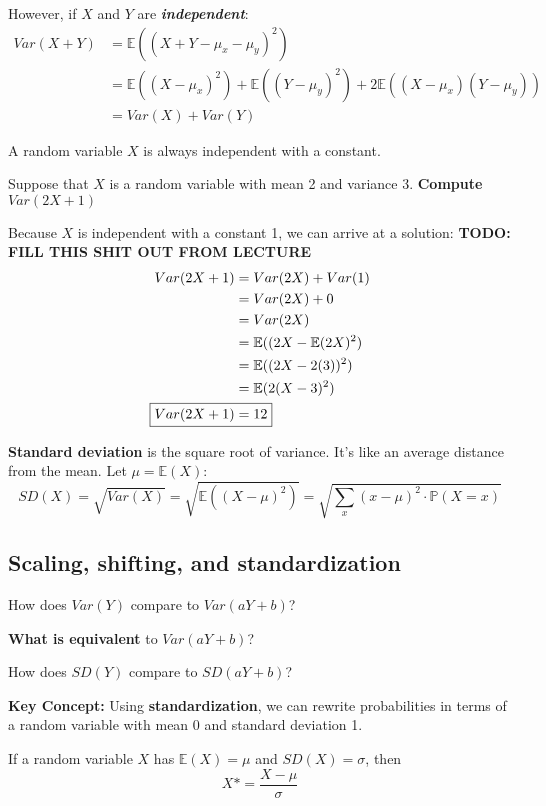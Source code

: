 \documentclass[titlepage, 12pt, leqno]{article}
\begin{document}
However, if $X$ and $Y$ are \textbf{\textit{independent}}:
\begin{align*}
    Var(X+Y) &= \mathbb{E}((X+Y-\mu_x-\mu_y)^2) \\
             &= \mathbb{E}((X-\mu_x)^2) + \mathbb{E}((Y-\mu_y)^2) +
             2 \mathbb{E}((X-\mu_x)(Y-\mu_y)) \\
             &= Var(X) + Var(Y)
\end{align*}

\begin{note}
    A random variable $X$ is always independent with a constant.
\end{note}

\begin{ex}
    Suppose that $X$ is a random variable with mean 2 and variance 3. 
    \textbf{Compute} $Var(2X+1)$
    \vspace{10px}
    
    Because $X$ is independent with a constant 1, we can arrive at a solution:
    \textbf{TODO: FILL THIS SHIT OUT FROM LECTURE}
   \begin{align*}
       Var(2X+1) &= Var(2X) + Var(1) \\
                 &= Var(2X) + 0 \\
                 &= Var(2X) \\
                 &= \mathbb{E}((2X- \mathbb{E}(2X)^2) \\
                 &= \mathbb{E}((2X - 2(3))^2) \\
                 &= \mathbb{E}(2(X-3)^2) \\
       \Aboxed{Var(2X+1)  &= 12} 
   \end{align*}
\end{ex}

\begin{definition}
    \textbf{Standard deviation} is the square root of variance. It's like an
    average distance from the mean. Let $\mu = \mathbb{E}(X)$:
\[
SD(X) = \sqrt{Var(X)} = \sqrt{ \mathbb{E}((X-\mu)^2)}
= \sqrt{\sum_{x}(x-\mu)^2\cdot \mathbb{P}(X=x)}
\]
\end{definition}

\subsection{Scaling, shifting, and standardization}
How does $Var(Y)$ compare to $Var(aY+b)$?

\begin{ex}
    \textbf{What is equivalent} to $Var(aY+b)$?
\end{ex}

\begin{ex}
    How does $SD(Y)$ compare to $SD(aY+b)$?
\end{ex}

\textbf{Key Concept:}
Using \textbf{standardization}, we can rewrite probabilities in terms of a random
variable with mean 0 and standard deviation 1.

If a random variable $X$ has $ \mathbb{E}(X) = \mu$ and $SD(X) = \sigma$, then
\[
    X* = \frac{X-\mu}{\sigma}
\]
\end{document}
